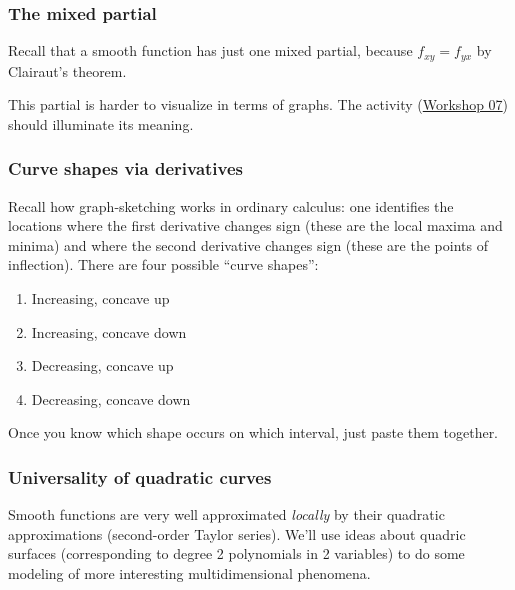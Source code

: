 \documentclass[11pt,ignorenonframetext,aspectratio=169,xcolor={svgnames}]{beamer}
\begin{document}
\begin{frame}\frametitle{The mixed partial}

Recall that a smooth function has just one mixed partial, because
$f_{xy} = f_{yx}$ by Clairaut's theorem.

This partial is harder to visualize in terms of graphs. The activity
(\href{../../workshops/07/Workshop.pdf}{Workshop 07}) should illuminate
its meaning.

\end{frame}

\begin{frame}\frametitle{Curve shapes via derivatives}

Recall how graph-sketching works in ordinary calculus: one identifies
the locations where the first derivative changes sign (these are the
local maxima and minima) and where the second derivative changes sign
(these are the points of inflection). There are four possible ``curve
shapes'':

\begin{enumerate}
\def\labelenumi{\arabic{enumi}.}

\item
  Increasing, concave up
\item
  Increasing, concave down
\item
  Decreasing, concave up
\item
  Decreasing, concave down
\end{enumerate}

Once you know which shape occurs on which interval, just paste them
together.

\end{frame}

\begin{frame}\frametitle{Universality of quadratic curves}

Smooth functions are very well approximated \emph{locally} by their
quadratic approximations (second-order Taylor series). We'll use ideas
about quadric surfaces (corresponding to degree 2 polynomials in 2
variables) to do some modeling of more interesting multidimensional
phenomena.

\end{frame}
\end{document}
